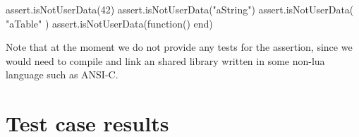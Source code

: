\startLuaTest
  assert.isNotUserData(42)
  assert.isNotUserData("aString")
  assert.isNotUserData({ "aTable" })
  assert.isNotUserData(function() end)
\stopLuaTest
\stopTestCase

\godown[2ex]
Note that at the moment we do not provide any  tests for 
the  assertion, since we would need to compile 
and link an shared library written in some non-lua language such as 
ANSI-C. 

\stopTestSuite

\section{Test case results}

\reportLuaStats

\stopchapter